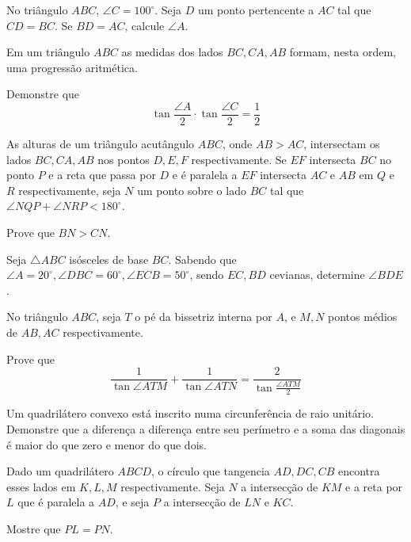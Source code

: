 \begin{questao}
  No triângulo $ABC$, $\angle C = 100^\circ$. Seja $D$ um ponto
  pertencente a $AC$ tal que $CD=BC$. Se $BD=AC$, calcule
  $\angle A$.
\end{questao}

\begin{questao}
  Em um triângulo $ABC$ as medidas dos lados $BC,CA,AB$ formam,
  nesta ordem, uma progressão aritmética.

  Demonstre que 
  $$ \tan\frac{\angle A}{2} \cdot \tan\frac{\angle C}{2} =
  \frac{1}{2} $$
\end{questao}

\begin{questao}
  As alturas de um triângulo acutângulo $ABC$, onde $AB>AC$,
  intersectam os lados $BC,CA,AB$ nos pontos $D,E,F$
  respectivamente. Se $EF$ intersecta $BC$ no ponto $P$ e a reta
  que passa por $D$ e é paralela a $EF$ intersecta $AC$ e $AB$
  em $Q$ e $R$ respectivamente, seja $N$ um ponto sobre o lado
  $BC$ tal que $\angle NQP + \angle NRP < 180^\circ$.

  Prove que $BN>CN$.
\end{questao}

\begin{questao}
  Seja $\triangle ABC$ isósceles de base $BC$. Sabendo que
  $\angle A = 20^\circ, \angle DBC=60^\circ, \angle ECB = 50^\circ$,
  sendo $EC,BD$ cevianas, determine $\angle BDE$.
\end{questao}

\begin{questao}
  No triângulo $ABC$, seja $T$ o pé da bissetriz interna por
  $A$, e $M,N$ pontos médios de $AB,AC$ respectivamente.

  Prove que $$ \frac{1}{\tan\angle ATM} + \frac{1}{\tan\angle ATN} =
  \frac{2}{\tan\frac{\angle ATM}{2}} $$
\end{questao}

\begin{questao}
  Um quadrilátero convexo está inscrito numa circunferência de
  raio unitário. Demonstre que a diferença a diferença entre seu
  perímetro e a soma das diagonais é maior do que zero e menor do que
  dois.
\end{questao}

\begin{questao}
  Dado um quadrilátero $ABCD$, o círculo que tangencia $AD,DC,CB$
  encontra esses lados em $K,L,M$ respectivamente. Seja $N$ a
  intersecção de $KM$ e a reta por $L$ que é paralela a $AD$, e
  seja $P$ a intersecção de $LN$ e $KC$.

  Mostre que $PL=PN$.
\end{questao}

